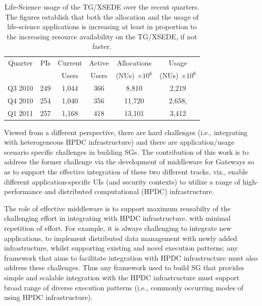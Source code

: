 \documentclass[]{svjour3}
\begin{document}


\begin{table}
\centering
 \small
\begin{tabular}{|c|c|c|c|c|c|} 
  \hline  Quarter & PIs & Current & Active & Allocations  & Usage\\
  & & Users  &  Users & (NUs) $\times 10^6$& (NUs) $\times 10^6$ \\ \hline
  Q3 2010 & 249 & 1,044 & 366 & 8,810   & 2,219  \\ \hline
  Q4 2010 & 254 & 1,040 & 356 & 11,720  & 2,658, \\ \hline
  Q1 2011 & 257 & 1,168 & 418 & 13,101  & 3,412\\ \hline 
\end{tabular} 
\caption{Life-Science usage of the TG/XSEDE over the recent
  quarters. The figures establish that both the  allocation and the
  usage of life-science applications is increasing at least in
  proportion to the increasing resource availability on the TG/XSEDE,
  if not faster.}
 \label{tg2011} 
\end{table}





Viewed from a different perspective, there are hard challenges (i.e.,
integrating with heterogeneous HPDC infrastructure) and there are
application/usage scenario specific challenges in building SGs. The
contribution of this work is to address the former challenge via the
development of middleware for Gateways so as to support the effective
integration of these two different tracks, viz., enable different
application-specific UIs (and security contexts) to utilize a range of
high-performance and distributed computational (HPDC) infrastructure.

The role of effective middleware is to support maximum reusabilty of
the challenging effort in integrating with HPDC infrastructure.  with
minimal repetition of effort.  For example, it is always challenging
to integrate new applications, to implement distributed data
management with newly added infrastructure, whilst supporting existing
and novel execution patterns; any framework that aims to facilitate
integration with HPDC infrastructure must also address these
challenges.  Thus any framework used to build SG that provides simple
and scalable integration with the HPDC infrastructure must support
broad range of diverse execution patterns (i.e., commonly occurring
modes of using HPDC infrastructure).
\end{document}
